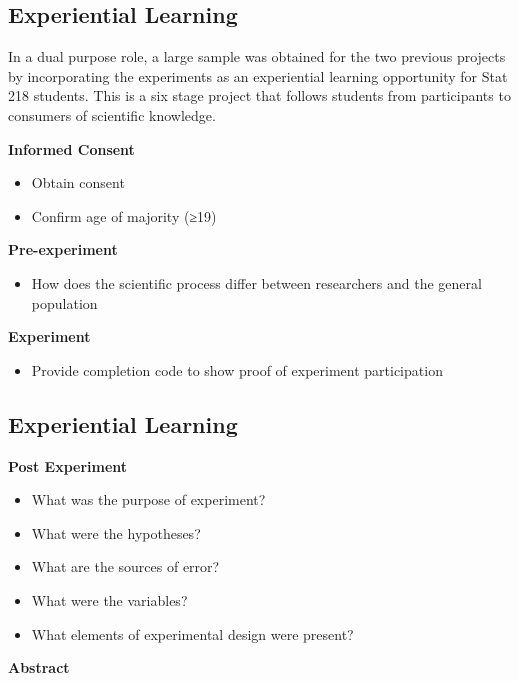 \documentclass[phd]{nuthesis}
\begin{document}
\subsection{Experiential Learning}\label{experiential-learning}

In a dual purpose role, a large sample was obtained for the two previous
projects by incorporating the experiments as an experiential learning
opportunity for Stat 218 students. This is a six stage project that
follows students from participants to consumers of scientific knowledge.

\textbf{Informed Consent}

\begin{itemize}
\tightlist
\item
  Obtain consent
\item
  Confirm age of majority (≥19)
\end{itemize}

\textbf{Pre-experiment}

\begin{itemize}
\tightlist
\item
  How does the scientific process differ between researchers and the
  general population
\end{itemize}

\textbf{Experiment}

\begin{itemize}
\tightlist
\item
  Provide completion code to show proof of experiment participation
\end{itemize}

\subsection{Experiential Learning}\label{experiential-learning-1}

\textbf{Post Experiment}

\begin{itemize}
\tightlist
\item
  What was the purpose of experiment?
\item
  What were the hypotheses?
\item
  What are the sources of error?
\item
  What were the variables?
\item
  What elements of experimental design were present?
\end{itemize}

\textbf{Abstract}
\end{document}
